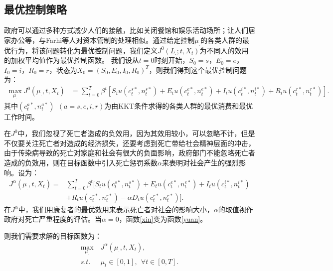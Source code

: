 \subsection{最优控制策略}
政府可以通过多种方式减少人们的接触，比如关闭餐馆和娱乐活动场所；让人们居家办公等，与Farhi\cite{farhi2012dealing}等人对资本管制的处理相似。通过给定控制$\mu_.$的各类人群的最优行为，将该问题转化为最优控制问题，我们定义$J^0(L_.;t,X_t)$为不同人的效用的加权平均值作为最优控制函数。
我们设从$t=0$时刻开始，$S_0=s$，$E_0=e$，$I_0=i$，$R_0=r$，状态为$X_0=(S_0,E_0,I_0,R_0)^T$，则我们得到这个最优控制问题为：
\begin{align}\label{yuan}
    \max_{\mu_{.}}J^0(\mu_{.},t,X_t)&=\sum_{t=0}^{T} \beta^t[S_t u(c_t^{s*},n_t^{s*})+E_t u(c_t^{e*},n_t^{e*})+I_t u(c_t^{i*},n_t^{i*})+R_t u(c_t^{r*},n_t^{r*})].
\end{align}
其中$(c_t^{a*},n_t^{a*}) \ \ (a=s,e,i,r)$为由KKT条件求得的各类人群的最优消费和最优工作时间。

在$J^0$中，我们忽视了死亡者造成的负效用，因为其效用较小，可以忽略不计，但是不仅要关注死亡者对造成的经济损失，还要考虑到死亡带给社会精神层面的冲击，由于传染病导致的死亡对家庭和社会有很大的负面影响，政府部门不能忽略死亡者造成的负效用，则在目标函数中引入死亡惩罚系数$\alpha$来表明对社会产生的强烈影响。设为：
\begin{equation}\label{xin}
	\begin{aligned}
		J^{\alpha}(\mu_{.},t,X_t)=&\sum_{t=0}^{T} \beta^t[S_t u(c_t^{s*},n_t^{s*})+E_t u(c_t^{e*},n_t^{e*})+I_t u(c_t^{i*},n_t^{i*}) \\
		&+R_t u(c_t^{r*},n_t^{r*})-\alpha D_t u(c_t^{r*},n_t^{r*})].
	\end{aligned}
\end{equation}
在$J^{\alpha}$中，我们用康复者的最优效用来表示死亡者对社会的影响大小，$\alpha$的取值视作政府对死亡严重程度的评估。当$\alpha=0$，函数\ref{xin}变为函数\ref{yuan}。

则我们需要求解的目标函数为：
\begin{equation}
    \begin{aligned}
    \max_{\mu_{.}}&J^{\alpha}(\mu_{.},t,X_t), \\
    s.t. \ \ \ &\mu_t\in[0,1], \ \ \forall t \in [0,T].
    \end{aligned}
\end{equation}




